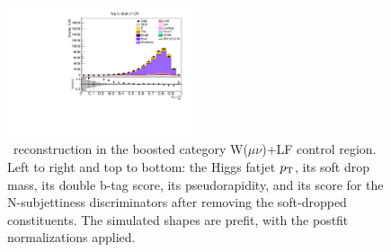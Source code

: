 \begin{figure}[tbp]
\begin{center}
    \includegraphics[width=0.48\textwidth]{figures/wlnhbb2016/boosted/WmnWHLightFlavorFJCR_fj1Tau32SD.pdf}
    \caption{\HBB\ reconstruction in the boosted category W($\mu\nu$)+LF control region.
    Left to right and top to bottom: the Higgs fatjet $p_{\mathrm{T}}$, its soft drop mass, its
    double b-tag score, its pseudorapidity, and its score for the N-subjettiness discriminators
    after removing the soft-dropped constituents.
    The simulated shapes are prefit, with the postfit normalizations applied.}
    \label{fig:boost_WmnLF_Hbb}
  \end{center}
\end{figure}
\clearpage

